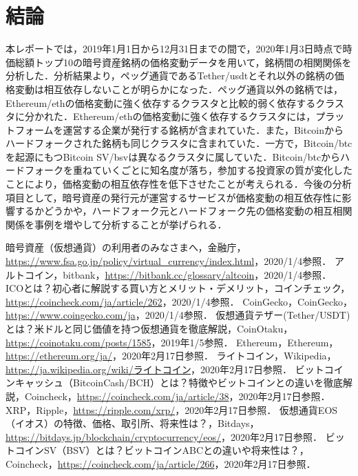 \documentclass{jsarticle}
\begin{document}
	\section{結論}
	本レポートでは，2019年1月1日から12月31日までの間で，2020年1月3日時点で時価総額トップ10の暗号資産銘柄の価格変動データを用いて，銘柄間の相関関係を分析した．分析結果より，ペッグ通貨であるTether/usdtとそれ以外の銘柄の価格変動は相互依存しないことが明らかになった．ペッグ通貨以外の銘柄では，Ethereum/ethの価格変動に強く依存するクラスタと比較的弱く依存するクラスタに分かれた．Ethereum/ethの価格変動に強く依存するクラスタには，プラットフォームを運営する企業が発行する銘柄が含まれていた．また，Bitcoinからハードフォークされた銘柄も同じクラスタに含まれていた．一方で，Bitcoin/btcを起源にもつBitcoin SV/bsvは異なるクラスタに属していた．Bitcoin/btcからハードフォークを重ねていくごとに知名度が落ち，参加する投資家の質が変化したことにより，価格変動の相互依存性を低下させたことが考えられる．今後の分析項目として，暗号資産の発行元が運営するサービスが価格変動の相互依存性に影響するかどうかや，ハードフォーク元とハードフォーク先の価格変動の相互相関関係を事例を増やして分析することが挙げられる．
	
	\begin{thebibliography}{5}
		 暗号資産（仮想通貨）の利用者のみなさまへ，金融庁，\url{https://www.fsa.go.jp/policy/virtual_currency/index.html}，2020/1/4参照．
		 アルトコイン，bitbank，\url{https://bitbank.cc/glossary/altcoin}，2020/1/4参照．
		 ICOとは？初心者に解説する買い方とメリット・デメリット，コインチェック，\url{https://coincheck.com/ja/article/262}，2020/1/4参照．
		 CoinGecko，CoinGecko，\url{https://www.coingecko.com/ja}，2020/1/4参照．
		 仮想通貨テザー(Tether/USDT)とは？米ドルと同じ価値を持つ仮想通貨を徹底解説，CoinOtaku，\url{https://coinotaku.com/posts/1585}，2019年1/5参照．
		 Ethereum，Ethereum， \url{https://ethereum.org/ja/}，2020年2月17日参照．
		 ライトコイン，Wikipedia，\url{https://ja.wikipedia.org/wiki/ライトコイン}，2020年2月17日参照．
		 ビットコインキャッシュ（BitcoinCash/BCH）とは？特徴やビットコインとの違いを徹底解説，Coincheck，\url{https://coincheck.com/ja/article/38}，2020年2月17日参照．
		 XRP，Ripple，\url{https://ripple.com/xrp/}，2020年2月17日参照．
		 仮想通貨EOS（イオス）の特徴、価格、取引所、将来性は？，Bitdays，\url{https://bitdays.jp/blockchain/cryptocurrency/eos/}，2020年2月17日参照．
		 ビットコインSV（BSV）とは？ビットコインABCとの違いや将来性は？，Coincheck，\url{https://coincheck.com/ja/article/266}，2020年2月17日参照．
	\end{thebibliography}
\end{document}
